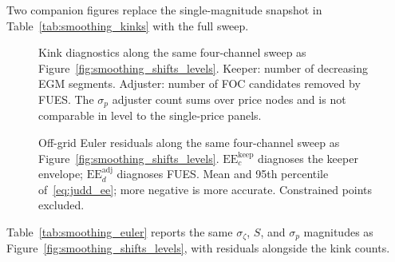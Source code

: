 Two companion figures replace the single-magnitude snapshot in Table~\ref{tab:smoothing_kinks} with the full sweep.

\begin{figure}[htbp]
	\centering
	\caption{Kink diagnostics along the same four-channel sweep as Figure~\ref{fig:smoothing_shifts_levels}. Keeper: number of decreasing EGM segments. Adjuster: number of FOC candidates removed by FUES. The $\sigma_p$ adjuster count sums over price nodes and is not comparable in level to the single-price panels.}
	\label{fig:smoothing_diagnostics_kinks}
\end{figure}

\begin{figure}[htbp]
	\centering
	\caption{Off-grid Euler residuals along the same four-channel sweep as Figure~\ref{fig:smoothing_shifts_levels}. $\mathrm{EE}_c^{\mathrm{keep}}$ diagnoses the keeper envelope; $\mathrm{EE}_d^{\mathrm{adj}}$ diagnoses FUES. Mean and 95th percentile of~\eqref{eq:judd_ee}; more negative is more accurate. Constrained points excluded.}
	\label{fig:smoothing_diagnostics_euler}
\end{figure}

Table~\ref{tab:smoothing_euler} reports the same $\sigma_\zeta$, $S$, and $\sigma_p$ magnitudes as Figure~\ref{fig:smoothing_shifts_levels}, with residuals alongside the kink counts.

